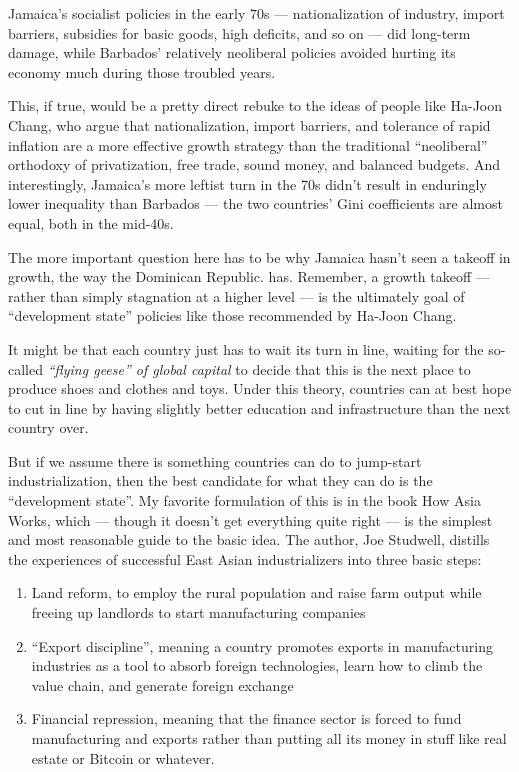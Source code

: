 \documentclass[
]{book}
\begin{document}
Jamaica's socialist policies in the early 70s --- nationalization of industry, import barriers, subsidies for basic goods, high deficits, and so on --- did long-term damage, while Barbados' relatively neoliberal policies avoided hurting its economy much during those troubled years.

This, if true, would be a pretty direct rebuke to the ideas of people like Ha-Joon Chang, who argue that nationalization, import barriers, and tolerance of rapid inflation are a more effective growth strategy than the traditional ``neoliberal'' orthodoxy of privatization, free trade, sound money, and balanced budgets. And interestingly, Jamaica's more leftist turn in the 70s didn't result in enduringly lower inequality than Barbados --- the two countries' Gini coefficients are almost equal, both in the mid-40s.

The more important question here has to be why Jamaica hasn't seen a takeoff in growth, the way the Dominican Republic. has. Remember, a growth takeoff --- rather than simply stagnation at a higher level --- is the ultimately goal of ``development state'' policies like those recommended by Ha-Joon Chang.

It might be that each country just has to wait its turn in line, waiting for the so-called \emph{``flying geese'' of global capital} to decide that this is the next place to produce shoes and clothes and toys. Under this theory, countries can at best hope to cut in line by having slightly better education and infrastructure than the next country over.

But if we assume there is something countries can do to jump-start industrialization, then the best candidate for what they can do is the ``development state''. My favorite formulation of this is in the book How Asia Works, which --- though it doesn't get everything quite right --- is the simplest and most reasonable guide to the basic idea. The author, Joe Studwell, distills the experiences of successful East Asian industrializers into three basic steps:

\begin{enumerate}
\def\labelenumi{\arabic{enumi}.}
\item
  Land reform, to employ the rural population and raise farm output while freeing up landlords to start manufacturing companies
\item
  ``Export discipline'', meaning a country promotes exports in manufacturing industries as a tool to absorb foreign technologies, learn how to climb the value chain, and generate foreign exchange
\item
  Financial repression, meaning that the finance sector is forced to fund manufacturing and exports rather than putting all its money in stuff like real estate or Bitcoin or whatever.
\end{enumerate}
\end{document}
